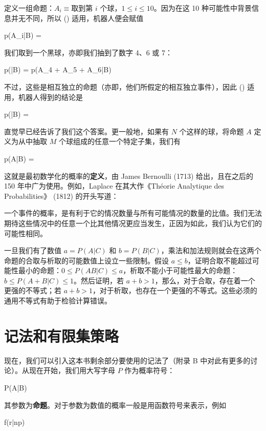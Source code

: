 定义一组命题：$A_i\equiv\text{取到第 } i\text{ 个球}$，$1\le i\le 10$。因为在这 10 种可能性中背景信息并无不同，所以 (\in[2-95]) 适用，机器人便会赋值

\placeformula[2-96]
\startformula
p(A_i|B) = 
\stopformula

我们取到一个黑球，亦即我们抽到了数字 4、6 或 7：

\placeformula[2-97]
\startformula
p(|B) = p(A_4 + A_5 + A_6|B)
\stopformula

不过，这些是相互独立的命题（亦即，他们所假定的相互独立事件），因此 (\in[2-85]) 适用，机器人得到的结论是

\placeformula[2-98]
\startformula
p(|B) = 
\stopformula

直觉早已经告诉了我们这个答案。更一般地，如果有 $N$ 个这样的球，将命题 $A$ 定义为从中抽取 $M$ 个球组成的任意一个特定子集，我们有

\placeformula[2-99]
\startformula
p(A|B) = 
\stopformula

这就是最初数学化的概率的{\bf 定义}，由 James Bernoulli (1713) 给出，且在之后的 150 年中广为使用。例如，Laplace 在其大作《Th\'eorie Analytique des Probabilities》 (1812) 的开头写道：

{\small 一个事件的概率，是有利于它的情况数量与所有可能情况的数量的比值。我们无法期待这些情况中的任意一个比其他情况更应当发生，正因为如此，我们认为它们的可能性相同。}

\startExercise
一旦我们有了数值 $a = P(A|C)$ 和 $b = P(B|C)$，乘法和加法规则就会在这两个命题的合取与析取的可能数值上设立一些限制。假设 $a\le b$，证明合取不能超过可能性最小的命题：$0\le P(AB|C) \le a$，析取不能小于可能性最大的命题：$b \le P(A+B|C) \le 1$。然后证明，若 $a + b > 1$，那么，对于合取，存在着一个更强的不等式；若 $a + b > 1$，对于析取，也存在一个更强的不等式。这些必须的通用不等式有助于检验计算错误。
\stopExercise

\section{记法和有限集策略}

现在，我们可以引入这本书剩余部分要使用的记法了（附录 B 中对此有更多的讨论）。从现在开始，我们用大写字母 $P$ 作为概率符号：

\placeformula[2-100]
\startformula
P(A|B)
\stopformula

其参数为{\bf 命题}。对于参数为数值的概率一般是用函数符号来表示，例如

\placeformula[2-101]
\startformula
f(r|np)
\stopformula

